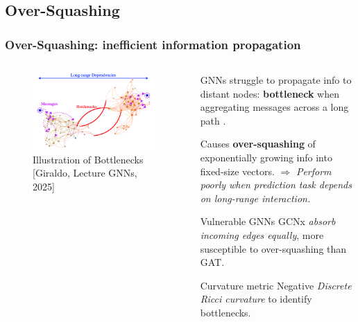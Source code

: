 \documentclass[10pt, aspectratio = 169]{beamer}
\begin{document}
\subsection{Over-Squashing}
\begin{frame}
    \frametitle{Over-Squashing: inefficient information propagation}
    
    \begin{columns}
        \begin{column}{0.4\textwidth}
            \begin{figure}
                \includegraphics[width=0.99\textwidth]{figures/over_squashing_Girarldo.png}
                \caption{Illustration of Bottlenecks [Giraldo, Lecture GNNs, 2025]}
            \end{figure}

        \end{column}    
        \begin{column}{0.6\textwidth}
            GNNs struggle to propagate info to distant nodes: \textbf{bottleneck} 
            when aggregating messages across a long path \cite[Alon et al., 2021]{alon2021bottleneckgraphneuralnetworks}.
            
            Causes \textbf{over-squashing} of exponentially growing info into fixed-size vectors.
            $\Rightarrow$ \emph{Perform poorly when prediction task depends on long-range interaction.}

            \begin{block}{Vulnerable GNNs}
                GCNx \emph{absorb incoming edges equally}, more susceptible to over-squashing than GAT.
            \end{block}
            \begin{block}{Curvature metric}
                Negative \emph{Discrete Ricci curvature} \cite[Topping et al. 2021]{topping2022understandingoversquashingbottlenecksgraphs} to identify bottlenecks.
            \end{block}
        \end{column}
    \end{columns}
\end{frame}
\end{document}
